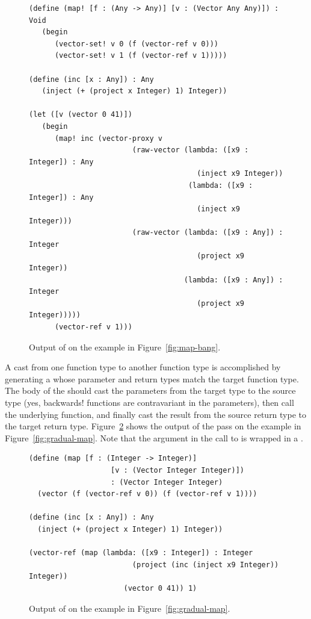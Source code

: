 \documentclass[7x10,nocrop]{TimesAPriori_MIT}%
\begin{document}
\begin{figure}[tbp]
\begin{lstlisting}
(define (map! [f : (Any -> Any)] [v : (Vector Any Any)]) : Void
   (begin 
      (vector-set! v 0 (f (vector-ref v 0)))
      (vector-set! v 1 (f (vector-ref v 1)))))
  
(define (inc [x : Any]) : Any
   (inject (+ (project x Integer) 1) Integer))

(let ([v (vector 0 41)])
   (begin 
      (map! inc (vector-proxy v
                        (raw-vector (lambda: ([x9 : Integer]) : Any
                                       (inject x9 Integer))
                                     (lambda: ([x9 : Integer]) : Any
                                       (inject x9 Integer)))
                        (raw-vector (lambda: ([x9 : Any]) : Integer
                                       (project x9 Integer))
                                    (lambda: ([x9 : Any]) : Integer
                                       (project x9 Integer)))))
      (vector-ref v 1)))
\end{lstlisting}
\caption{Output of  on the example in
  Figure~\ref{fig:map-bang}.}
\label{fig:map-bang-lower-cast}
\end{figure}

A cast from one function type to another function type is accomplished
by generating a  whose parameter and return types match
the target function type. The body of the  should cast
the parameters from the target type to the source type (yes,
backwards! functions are contravariant in the
parameters), then call the underlying function, and finally cast the
result from the source return type to the target return type.
Figure~\ref{fig:map-lower-cast} shows the output of the
 pass on the  example in
Figure~\ref{fig:gradual-map}. Note that the  argument
in the call to  is wrapped in a .

\begin{figure}[tbp]
\begin{lstlisting}
(define (map [f : (Integer -> Integer)]
                   [v : (Vector Integer Integer)])
                   : (Vector Integer Integer)
  (vector (f (vector-ref v 0)) (f (vector-ref v 1))))

(define (inc [x : Any]) : Any
  (inject (+ (project x Integer) 1) Integer))

(vector-ref (map (lambda: ([x9 : Integer]) : Integer
                        (project (inc (inject x9 Integer)) Integer))
                      (vector 0 41)) 1)
\end{lstlisting}
\caption{Output of  on the example in
  Figure~\ref{fig:gradual-map}.}
\label{fig:map-lower-cast}
\end{figure}
\end{document}
